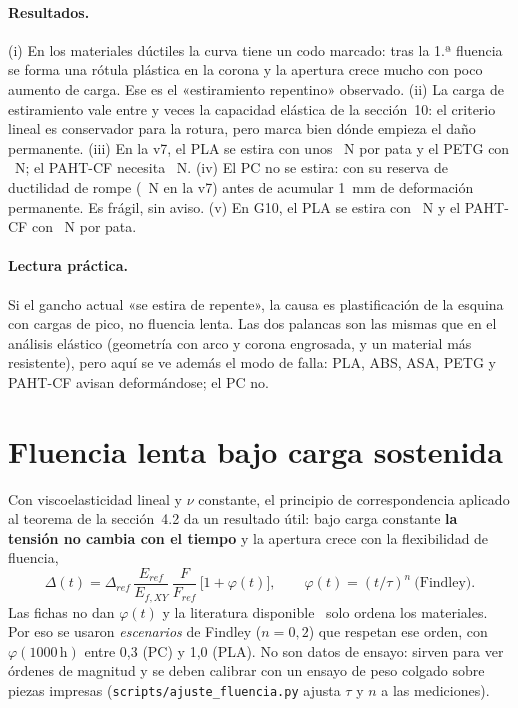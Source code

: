 \documentclass[11pt,a4paper]{article}
\begin{document}
\paragraph{Resultados.} (i) En los materiales dúctiles la curva tiene un codo marcado: tras la 1.ª fluencia se forma una rótula plástica en la corona y la apertura crece mucho con poco aumento de carga. Ese es el «estiramiento repentino» observado. (ii) La carga de estiramiento vale entre \NLratioMin{} y \NLratioMax{} veces la capacidad elástica de la sección~10: el criterio lineal es conservador para la rotura, pero marca bien dónde empieza el daño permanente. (iii) En la v7, el PLA se estira con unos \NLoffPLAsix~N por pata y el PETG con \NLoffPETGsix~N; el PAHT-CF necesita \NLoffPAHTsix~N. (iv) El PC no se estira: con su reserva de ductilidad de \DuctPC{} rompe (\NLrupPCsix~N en la v7) antes de acumular 1~mm de deformación permanente. Es frágil, sin aviso. (v) En G10, el PLA se estira con \NLoffPLAten~N y el PAHT-CF con \NLoffPAHTten~N por pata.

\paragraph{Lectura práctica.} Si el gancho actual «se estira de repente», la causa es plastificación de la esquina con cargas de pico, no fluencia lenta. Las dos palancas son las mismas que en el análisis elástico (geometría con arco y corona engrosada, y un material más resistente), pero aquí se ve además el modo de falla: PLA, ABS, ASA, PETG y PAHT-CF avisan deformándose; el PC no.

\section{Fluencia lenta bajo carga sostenida}\label{sec:creep}
Con viscoelasticidad lineal y $\nu$ constante, el principio de correspondencia aplicado al teorema de la sección~4.2 da un resultado útil: bajo carga constante \textbf{la tensión no cambia con el tiempo} y la apertura crece con la flexibilidad de fluencia,
\begin{equation}
\Delta(t)=\Delta_{ref}\,\frac{E_{ref}}{E_{f,XY}}\,\frac{F}{F_{ref}}\,\bigl[1+\varphi(t)\bigr],\qquad \varphi(t)=(t/\tau)^n\ \text{(Findley)}.
\end{equation}
Las fichas no dan $\varphi(t)$ y la literatura disponible~\cite{dogan,hausler} solo ordena los materiales. Por eso se usaron \emph{escenarios} de Findley ($n=0{,}2$) que respetan ese orden, con $\varphi(1000\,\text{h})$ entre 0,3 (PC) y 1,0 (PLA). No son datos de ensayo: sirven para ver órdenes de magnitud y se deben calibrar con un ensayo de peso colgado sobre piezas impresas (\texttt{scripts/ajuste\_fluencia.py} ajusta $\tau$ y $n$ a las mediciones).
\end{document}
